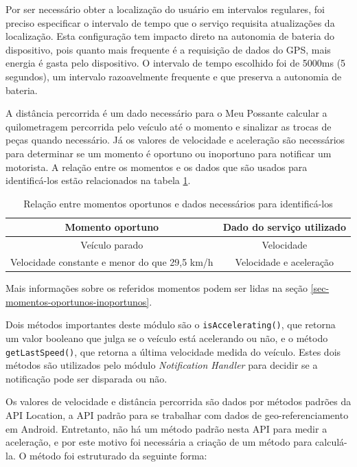 Por ser necessário obter a localização do usuário em intervalos regulares, foi preciso especificar o intervalo de tempo que o
serviço requisita atualizações da localização. Esta configuração tem impacto direto na autonomia de bateria do dispositivo,
pois quanto mais frequente é a requisição de dados do GPS, mais energia é gasta pelo dispositivo. O intervalo de tempo escolhido
foi de 5000ms (5 segundos), um intervalo razoavelmente frequente e que preserva a autonomia de bateria.

A distância percorrida é um dado necessário para o Meu Possante calcular a quilometragem percorrida pelo veículo até o momento e
sinalizar as trocas de peças quando necessário. Já os valores de velocidade e aceleração são necessários para determinar se um
momento é oportuno ou inoportuno para notificar um motorista. A relação entre os momentos e os dados que são usados para
identificá-los estão relacionados na tabela \ref{tabela-momentos-dados}.

\begin{table}[h]
\centering
\caption{Relação entre momentos oportunos e dados necessários para identificá-los}
\label{tabela-momentos-dados}
\begin{tabular}{|c|c|}
\hline
\textbf{Momento oportuno}                     & \textbf{Dado do serviço utilizado} \\ \hline
Veículo parado                                & Velocidade                         \\ \hline
Velocidade constante e menor do que 29,5 km/h & Velocidade e aceleração            \\ \hline
\end{tabular}
\end{table}

Mais informações sobre os referidos momentos podem ser lidas na seção \ref{sec-momentos-oportunos-inoportunos}.

Dois métodos importantes deste módulo são o \lstinline[basicstyle=\ttfamily\color{black}]|isAccelerating()|, que retorna um valor
booleano que julga se o veículo está acelerando ou não, e o método \lstinline[basicstyle=\ttfamily\color{black}]|getLastSpeed()|, que
retorna a última velocidade medida do veículo. Estes dois métodos são utilizados pelo módulo \textit{Notification Handler} para decidir se
a notificação pode ser disparada ou não.

Os valores de velocidade e distância percorrida são dados por métodos padrões da API Location, a API padrão para se trabalhar
com dados de geo-referenciamento em Android. Entretanto, não há um método padrão nesta API para medir a aceleração, e por este
motivo foi necessária a criação de um método para calculá-la. O método foi estruturado da seguinte forma:

